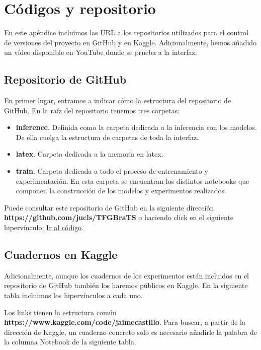\chapter{Códigos y repositorio}

En este apéndice incluimos las URL a los repositorios utilizados para el control de versiones del proyecto en GitHub y en Kaggle. Adicionalmente, hemos añadido un vídeo disponible en YouTube donde se prueba a la interfaz.

\section{Repositorio de GitHub}

En primer lugar, entramos a indicar cómo la estructura del repositorio de GitHub. En la raíz del repositorio tenemos tres carpetas:

\begin{itemize}
	\item \textbf{inference}. Definida como la carpeta dedicada a la inferencia con los modelos. De ella cuelga la estructura de carpetas de toda la interfaz. 
	\item \textbf{latex}. Carpeta dedicada a la memoria en latex.
	\item \textbf{train}. Carpeta dedicada a todo el proceso de entrenamiento y experimentación. En esta carpeta se encuentran los distintos notebooks que componen la construcción de los modelos y experimentos realizados. 
\end{itemize}

Puede consultar este repositorio de GitHub en la siguiente dirección \textbf{https://github.com/jucls/TFGBraTS} o haciendo click en el siguiente hipervínculo: \href{https://github.com/jucls/TFGBraTS}{Ir al código}.

\section{Cuadernos en Kaggle}

Adicionalmente, aunque los cuadernos de los experimentos están incluidos en el repositorio de GitHub también los haremos públicos en Kaggle. En la siguiente tabla incluimos los hipervínculos a cada uno.

Los links tienen la estructura común \textbf{https://www.kaggle.com/code/jaimecastillo}. Para buscar, a partir de la dirección de Kaggle, un cuaderno concreto solo es necesario añadirle la palabra de la columna Notebook de la siguiente tabla.

